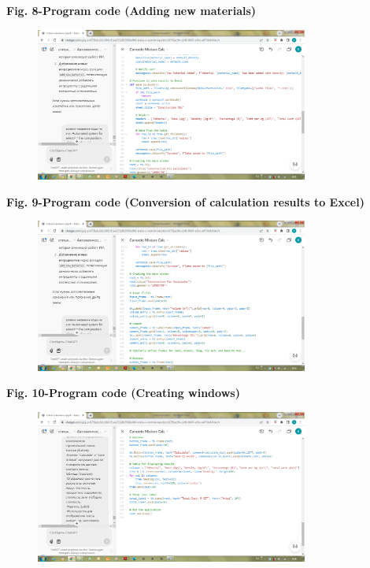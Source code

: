{{\bfseries Fig. 8-Program code (Adding new materials)}

\begin{figure}[H]
	\centering
	\includegraphics[width=0.8\textwidth]{media/ict3/image10}
	\caption*{}
\end{figure}


{\bfseries Fig. 9-Program code (Conversion of calculation results to
Excel)}

\begin{figure}[H]
	\centering
	\includegraphics[width=0.8\textwidth]{media/ict3/image11}
	\caption*{}
\end{figure}


{\bfseries Fig. 10-Program code (Creating windows)}

\begin{figure}[H]
	\centering
	\includegraphics[width=0.8\textwidth]{media/ict3/image12}
	\caption*{}
\end{figure}


}
